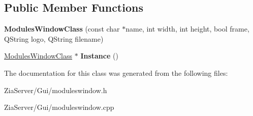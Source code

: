 \subsection*{Public Member Functions}
\begin{DoxyCompactItemize}
\item 
\hypertarget{class_modules_window_class_a5f2d43af6761e0ab838bd023f847a009}{
{\bfseries ModulesWindowClass} (const char $\ast$name, int width, int height, bool frame, QString logo, QString filename)}
\label{class_modules_window_class_a5f2d43af6761e0ab838bd023f847a009}

\item 
\hypertarget{class_modules_window_class_ae6670c8b282f104cec39a18050274e8c}{
\hyperlink{class_modules_window_class}{ModulesWindowClass} $\ast$ {\bfseries Instance} ()}
\label{class_modules_window_class_ae6670c8b282f104cec39a18050274e8c}

\end{DoxyCompactItemize}


The documentation for this class was generated from the following files:\begin{DoxyCompactItemize}
\item 
ZiaServer/Gui/moduleswindow.h\item 
ZiaServer/Gui/moduleswindow.cpp\end{DoxyCompactItemize}
